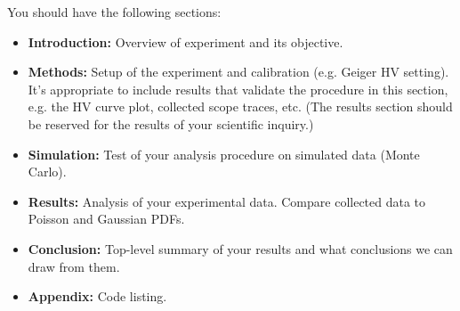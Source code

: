 \documentclass[12pt]{article}
\begin{document}
You should have the following sections:
\begin{itemize}
\item  {\bf Introduction:} Overview of experiment and its objective.
\item {\bf Methods:} Setup of the experiment and calibration (e.g. Geiger HV setting).  It's appropriate to include results that validate the procedure in this section, e.g. the HV curve plot, collected scope traces, etc.  (The results section should be reserved for the results of your scientific inquiry.)
\item {\bf Simulation: } Test of your analysis procedure on simulated data (Monte Carlo).
\item {\bf Results: }  Analysis of your experimental data.  Compare collected data to Poisson and Gaussian PDFs.
\item {\bf Conclusion:  }  Top-level summary of your results and what conclusions we can draw from them.
\item {\bf Appendix:  }  Code listing.
\end{itemize}
\end{document}
